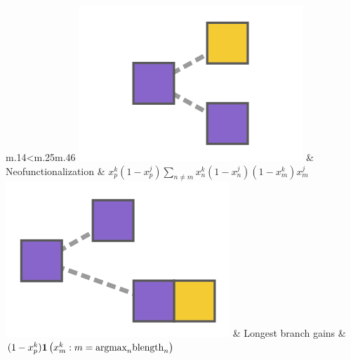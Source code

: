 \documentclass[10pt,aspectratio=169]{beamer}
\newcounter{frame}[frame]
\begin{document}
\begin{frame}
\begin{minipage}[b]{.95\linewidth}
\begin{table}
\begin{tabular}{m{.14\linewidth}<\centering m{.25\linewidth}m{.46\linewidth}}
	\includegraphics[width=\fwidth]{fig/term-neofun.png} & %
		Neofunctionalization & $x_p^k(1 - x_p^j)\sum_{n\neq m}x_n^k(1-x_n^j)(1-x_m^k)x_m^j$ \\
	\includegraphics[width=\fwidth]{fig/term-longest.png} & %
		Longest branch gains & $(1-x_p^k){\boldsymbol{1}\left( x_m^k : m=\text{argmax}_n\text{blength}_n \right)}$ \\
	\bottomrule
	\end{tabular}
	\caption{\textit{Example of sufficient statistics for evolutionary transitions}. $x_n^i \in \{0,1\}$, equal to 1 if the function $i$ is present in gene $n$. The $p$ subscript denotes parent gene.}
	\end{table}
 \normalsize
 \end{minipage}
 
\end{frame}
\end{document}
